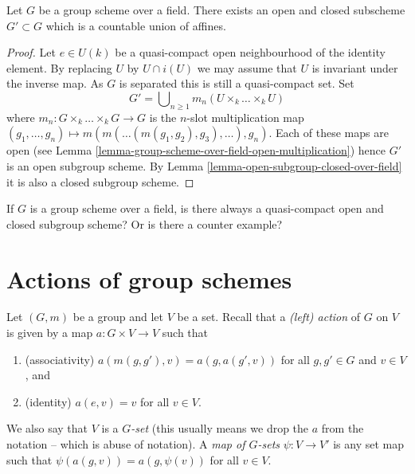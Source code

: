 \begin{lemma}
\label{lemma-group-scheme-field-countable-affine}
Let $G$ be a group scheme over a field.
There exists an open and closed subscheme $G' \subset G$
which is a countable union of affines.
\end{lemma}

\begin{proof}
Let $e \in U(k)$ be a quasi-compact open neighbourhood of the identity
element. By replacing $U$ by $U \cap i(U)$ we may assume that
$U$ is invariant under the inverse map. As $G$ is separated this is
still a quasi-compact set. Set
$$
G' = \bigcup\nolimits_{n \geq 1} m_n(U \times_k \ldots \times_k U)
$$
where $m_n : G \times_k \ldots \times_k G \to G$ is the $n$-slot
multiplication map
$(g_1, \ldots, g_n) \mapsto m(m(\ldots (m(g_1, g_2), g_3), \ldots ), g_n)$.
Each of these maps are open (see
Lemma \ref{lemma-group-scheme-over-field-open-multiplication})
hence $G'$ is an open subgroup scheme. By
Lemma \ref{lemma-open-subgroup-closed-over-field}
it is also a closed subgroup scheme.
\end{proof}

\begin{remark}
\label{remark-easy}
If $G$ is a group scheme over a field, is there always a quasi-compact
open and closed subgroup scheme? Or is there a counter example?
\end{remark}





\section{Actions of group schemes}
\label{section-action-group-scheme}

\noindent
Let $(G, m)$ be a group and let $V$ be a set.
Recall that a {\it (left) action} of $G$ on $V$ is given
by a map $a : G \times V \to V$ such that
\begin{enumerate}
\item (associativity) $a(m(g, g'), v) = a(g, a(g', v))$ for all
$g, g' \in G$ and $v \in V$, and
\item (identity) $a(e, v) = v$ for all $v \in V$.
\end{enumerate}
We also say that $V$ is a {\it $G$-set} (this usually means we
drop the $a$ from the notation -- which is abuse of notation).
A {\it map of $G$-sets} $\psi : V \to V'$ is any set map
such that $\psi(a(g, v)) = a(g, \psi(v))$ for all $v \in V$.

